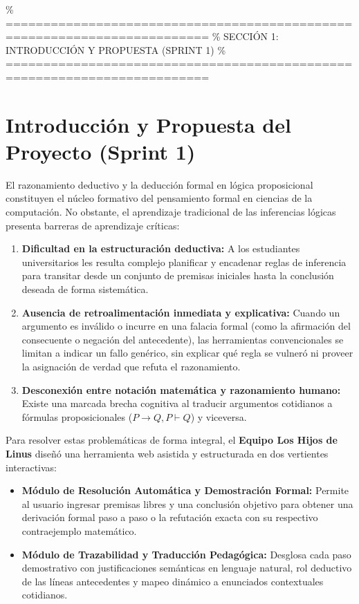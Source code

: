 \documentclass[11pt,a4paper]{article}
\begin{document}
\% =========================================================================
\% SECCIÓN 1: INTRODUCCIÓN Y PROPUESTA (SPRINT 1)
\% =========================================================================
\newpage
\section{Introducción y Propuesta del Proyecto (Sprint 1)}

El razonamiento deductivo y la deducción formal en lógica proposicional constituyen el núcleo formativo del pensamiento formal en ciencias de la computación. No obstante, el aprendizaje tradicional de las inferencias lógicas presenta barreras de aprendizaje críticas:
\begin{enumerate}[label=\alph*)]
    \item \textbf{Dificultad en la estructuración deductiva:} A los estudiantes universitarios les resulta complejo planificar y encadenar reglas de inferencia para transitar desde un conjunto de premisas iniciales hasta la conclusión deseada de forma sistemática.
    \item \textbf{Ausencia de retroalimentación inmediata y explicativa:} Cuando un argumento es inválido o incurre en una falacia formal (como la afirmación del consecuente o negación del antecedente), las herramientas convencionales se limitan a indicar un fallo genérico, sin explicar qué regla se vulneró ni proveer la asignación de verdad que refuta el razonamiento.
    \item \textbf{Desconexión entre notación matemática y razonamiento humano:} Existe una marcada brecha cognitiva al traducir argumentos cotidianos a fórmulas proposicionales ($P \to Q, P \vdash Q$) y viceversa.
\end{enumerate}

Para resolver estas problemáticas de forma integral, el \textbf{Equipo Los Hijos de Linus} diseñó una herramienta web asistida y estructurada en dos vertientes interactivas:

\begin{itemize}[leftmargin=1.5cm]
    \item \textbf{Módulo de Resolución Automática y Demostración Formal:} Permite al usuario ingresar premisas libres y una conclusión objetivo para obtener una derivación formal paso a paso o la refutación exacta con su respectivo contraejemplo matemático.
    \item \textbf{Módulo de Trazabilidad y Traducción Pedagógica:} Desglosa cada paso demostrativo con justificaciones semánticas en lenguaje natural, rol deductivo de las líneas antecedentes y mapeo dinámico a enunciados contextuales cotidianos.
\end{itemize}
\end{document}
